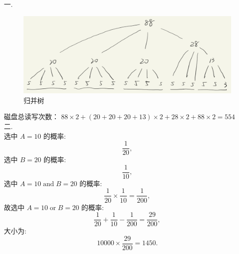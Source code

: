 \documentclass{article}
\begin{document}
一.\\
\begin{figure}[htbp]
    \centering
    \includegraphics[scale=0.4]{tree.png}
    \caption{归并树}
\end{figure}
磁盘总读写次数：
$88 \times 2 + (20 + 20 + 20 + 13) \times 2 + 28 \times 2 + 88 \times 2 = 554$
\\
二. \\
选中 $A = 10$ 的概率: 
\[\frac{1}{20},\]
选中 $B = 20$ 的概率: 
\[\frac{1}{10},\]
选中 $A = 10\; \text{and}\; B = 20$ 的概率: 
\[\frac{1}{20} \times \frac{1}{10} = \frac{1}{200},\]
故选中 $A = 10\; \text{or}\; B = 20$ 的概率: 
\[\frac{1}{20} + \frac{1}{10} - \frac{1}{200} = \frac{29}{200},\]
大小为: 
\[10000 \times \frac{29}{200} = 1450.\]
\end{document}
